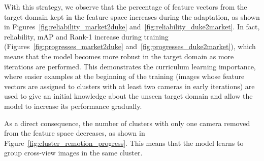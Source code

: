 \documentclass[journal]{IEEEtran}
\begin{document}
With this strategy, we observe that the percentage of feature vectors from the target domain kept in the feature space increases during the adaptation, as shown in Figures~\ref{fig:reliability_market2duke} and~\ref{fig:reliability_duke2market}. In fact, reliability, mAP and Rank-1 increase during training (Figures~\ref{fig:progresses_market2duke} and~\ref{fig:progresses_duke2market}), which means that the model becomes more robust in the target domain as more iterations are performed. This demonstrates the curriculum learning importance, where easier examples at the beginning of the training (images whose feature vectors are assigned to clusters with at least two cameras in early iterations) are used to give an initial knowledge about the unseen target domain and allow the model to increase its performance gradually.

\begin{figure*}[ht]
\centering
{}
\hfil
{}
\hfil
{}
\caption{Progress on Rank-1, mean Average Precision and Reliability on target dataset, in the Market1501 to DukeMTMC-ReID scenario.}
\label{fig:progresses_market2duke}
\end{figure*}

\begin{figure*}[ht]
\centering
{}
\hfil
{}
\hfil
{}
\caption{Progress on Rank-1, mean Average Precision and Reliability on target dataset on DukeMTMC-ReID to Market1501 scenario.}
\label{fig:progresses_duke2market}
\end{figure*}



As a direct consequence, the number of clusters with only one camera removed from the feature space decreases, as shown in Figure~\ref{fig:cluster_remotion_progress}. This means that the model learns to group cross-view images in the same cluster. 
\end{document}

